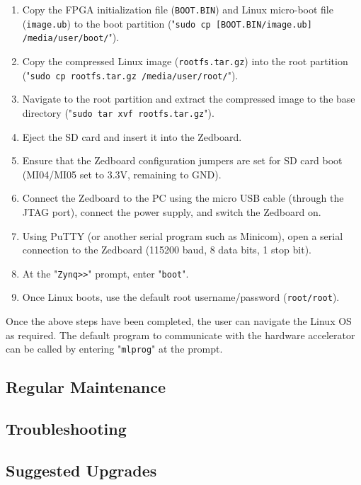 \documentclass[10pt,letterpaper]{article}
\begin{document}
\begin{enumerate}
\item Copy the FPGA initialization file (\texttt{BOOT.BIN}) and Linux micro-boot file (\texttt{image.ub}) to the boot partition ("\texttt{sudo cp [BOOT.BIN/image.ub] /media/user/boot/}").
\item Copy the compressed Linux image (\texttt{rootfs.tar.gz}) into the root partition ("\texttt{sudo cp rootfs.tar.gz /media/user/root/}"). 
\item Navigate to the root partition and extract the compressed image to the base directory ("\texttt{sudo tar xvf rootfs.tar.gz}").
\item Eject the SD card and insert it into the Zedboard.
\item Ensure that the Zedboard configuration jumpers are set for SD card boot (MI04/MI05 set to 3.3V, remaining to GND).
\item Connect the Zedboard to the PC using the micro USB cable (through the JTAG port), connect the power supply, and switch the Zedboard on.
\item Using PuTTY (or another serial program such as Minicom), open a serial connection to the Zedboard (115200 baud, 8 data bits, 1 stop bit).
\item At the "\texttt{Zynq>>}" prompt, enter "\texttt{boot}".
\item Once Linux boots, use the default root username/password (\texttt{root/root}).
\end{enumerate}

Once the above steps have been completed, the user can navigate the Linux OS as required. The default program to communicate with the hardware accelerator can be called by entering "\texttt{mlprog}" at the prompt.

\subsection{Regular Maintenance}
\subsection{Troubleshooting}
\subsection{Suggested Upgrades}
\clearpage
{}



\end{document}
